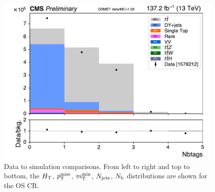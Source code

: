 \begin{figure}[!htb]
\includegraphics[width=0.45\linewidth]{figs/ssan/cr/run2_osmet_nbtags_in.pdf}
\caption{ Data to simulation comparisons. From left to right  and top to bottom,
the $H_{\mathrm{T}}$, $p_{\mathrm{T}}^\text{miss}$, $m_{\mathrm{T}}^{\text{min}}$, $N_\text{jets}$, $N_\mathrm{b}$ distributions are
shown for the OS CR.}
\label{fig:OSBaselineMET}
\end{figure}




